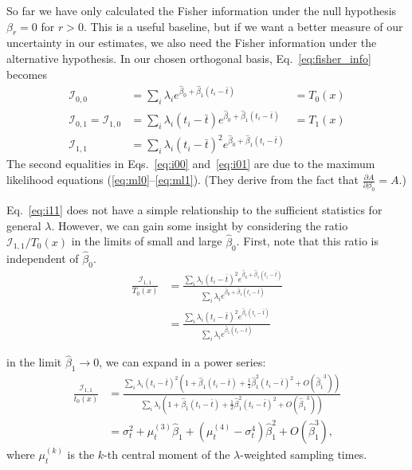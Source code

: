 \documentclass[12pt, letterpaper]{article}
\begin{document}
So far we have only calculated the Fisher information under the null hypothesis $\beta_r = 0$ for $r > 0$.
This is a useful baseline, but if we want a better measure of our uncertainty in our estimates, we also need the Fisher information under the alternative hypothesis.
In our chosen orthogonal basis, Eq.~\ref{eq:fisher_info} becomes
\begin{align}
    \mathcal{I}_{0,0} &= \sum_i \lambda_i e^{\hat{\beta}_0 + \hat{\beta}_1 (t_i - \bar{t})}
                      &= T_0(x) \label{eq:i00} \\
    \mathcal{I}_{0,1} = \mathcal{I}_{1,0} &= \sum_i \lambda_i (t_i - \bar{t}) e^{\hat{\beta}_0 + \hat{\beta}_1 (t_i - \bar{t})}
                                          &= T_1(x) \label{eq:i01} \\
    \mathcal{I}_{1,1} &= \sum_i \lambda_i {(t_i - \bar{t})}^2 e^{\hat{\beta}_0 + \hat{\beta}_1 (t_i - \bar{t})} \label{eq:i11}
\end{align}
The second equalities in Eqs.~\ref{eq:i00} and~\ref{eq:i01} are due to the maximum likelihood equations (\ref{eq:ml0}--\ref{eq:ml1}).
(They derive from the fact that $\frac{\partial A}{\partial \beta_0} = A$.)

Eq.~\ref{eq:i11} does not have a simple relationship to the sufficient statistics for general $\lambda$.
However, we can gain some insight by considering the ratio $\mathcal{I}_{1,1} / T_0(x)$ in the limits of small and large $\hat{\beta}_0$.
First, note that this ratio is independent of $\hat{\beta}_0$.
\begin{align}
    \frac{\mathcal{I}_{1,1}}{T_0(x)} &= \frac
        {\sum_i \lambda_i {(t_i - \bar{t})}^2 e^{\hat{\beta}_0 + \hat{\beta}_1 (t_i - \bar{t})}}
        {\sum_i \lambda_i e^{\hat{\beta}_0 + \hat{\beta}_1 (t_i - \bar{t})}} \\
                                     &= \frac
        {\sum_i \lambda_i {(t_i - \bar{t})}^2 e^{\hat{\beta}_1 (t_i - \bar{t})}}
        {\sum_i \lambda_i e^{\hat{\beta}_1 (t_i - \bar{t})}}
\end{align}

in the limit $\hat{\beta}_1 \to 0$, we can expand in a power series:
\begin{align}
    \frac{\mathcal{I}_{1,1}}{t_0(x)} &= \frac
        {\sum_i \lambda_i {(t_i - \bar{t})}^2 \left(1 + \hat{\beta}_1 (t_i - \bar{t}) + \frac{1}{2}\hat{\beta}_1^2 {(t_i - \bar{t})}^2 + O({\hat{\beta}_1}^3)\right)}
        {\sum_i \lambda_i \left(1 + \hat{\beta}_1 (t_i - \bar{t}) + \frac{1}{2}\hat{\beta}_1^2{(t_i - \bar{t})}^2 + O({\hat{\beta}_1}^3)\right)} \\
                                     &= \sigma_t^2 + \mu_t^{(3)} \hat{\beta}_1 + (\mu_t^{(4)} - \sigma_t^4) \hat{\beta}_1^2 + O(\hat{\beta}_1^3),
\end{align}
where $\mu_t^{(k)}$ is the $k$-th central moment of the $\lambda$-weighted sampling times.
\end{document}
